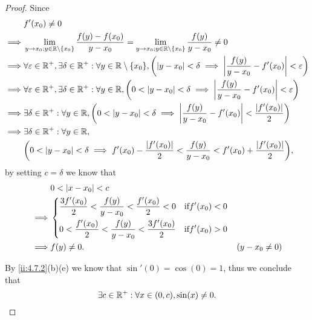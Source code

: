 \begin{proof}
  Since
  \begin{align*}
             & f'(x_0) \neq 0                                                                                                                                                                                \\
    \implies & \lim_{y \to x_0 ; y \in \R \setminus \set{x_0}} \dfrac{f(y) - f(x_0)}{y - x_0} = \lim_{y \to x_0 ; y \in \R \setminus \set{x_0}} \dfrac{f(y)}{y - x_0} \neq 0                                 \\
    \implies & \forall \varepsilon \in \R^+, \exists \delta \in \R^+ : \forall y \in \R \setminus \set{x_0}, \bigg(\abs{y - x_0} < \delta \implies \abs{\dfrac{f(y)}{y - x_0} - f'(x_0)} < \varepsilon\bigg) \\
    \implies & \forall \varepsilon \in \R^+, \exists \delta \in \R^+ : \forall y \in \R, \bigg(0 < \abs{y - x_0} < \delta \implies \abs{\dfrac{f(y)}{y - x_0} - f'(x_0)} < \varepsilon\bigg)                 \\
    \implies & \exists \delta \in \R^+ : \forall y \in \R, \bigg(0 < \abs{y - x_0} < \delta \implies \abs{\dfrac{f(y)}{y - x_0} - f'(x_0)} < \dfrac{\abs{f'(x_0)}}{2}\bigg)                                  \\
    \implies & \exists \delta \in \R^+ : \forall y \in \R,                                                                                                                                                   \\
             & \bigg(0 < \abs{y - x_0} < \delta \implies f'(x_0) - \dfrac{\abs{f'(x_0)}}{2} < \dfrac{f(y)}{y - x_0} < f'(x_0) + \dfrac{\abs{f'(x_0)}}{2}\bigg),
  \end{align*}
  by setting \(c = \delta\) we know that
  \begin{align*}
             & 0 < \left\lvert x - x_0\right\rvert < c                                                                                               \\
    \implies & \begin{dcases}
                 \dfrac{3 f'(x_0)}{2} < \dfrac{f(y)}{y - x_0} < \dfrac{f'(x_0)}{2} < 0 & \text{if} f'(x_0) < 0 \\
                 0 < \dfrac{f'(x_0)}{2} < \dfrac{f(y)}{y - x_0} < \dfrac{3 f'(x_0)}{2} & \text{if} f'(x_0) > 0
               \end{dcases}                       \\
    \implies & f(y) \neq 0.                                                                                     & (y - x_0 \neq 0)
  \end{align*}

  By \cref{ii:4.7.2}(b)(e) we know that \(\sin'(0) = \cos(0) = 1\), thus we conclude that
  \[
    \exists c \in \mathbb{R}^+ : \forall x \in (0, c), \sin(x) \neq 0.
  \]
\end{proof}

